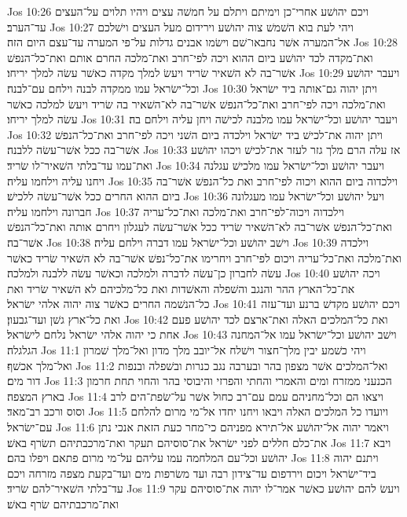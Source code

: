 Jos 10:26  ויכם יהושׁע אחרי־כן וימיתם ויתלם על חמשׁה עצים ויהיו תלוים על־העצים עד־הערב׃
Jos 10:27  ויהי לעת בוא השׁמשׁ צוה יהושׁע וירידום מעל העצים וישׁלכם אל־המערה אשׁר נחבאו־שׁם וישׂמו אבנים גדלות על־פי המערה עד־עצם היום הזה׃
Jos 10:28  ואת־מקדה לכד יהושׁע ביום ההוא ויכה לפי־חרב ואת־מלכה החרם אותם ואת־כל־הנפשׁ אשׁר־בה לא השׁאיר שׂריד ויעשׂ למלך מקדה כאשׁר עשׂה למלך יריחו׃
Jos 10:29  ויעבר יהושׁע וכל־ישׂראל עמו ממקדה לבנה וילחם עם־לבנה׃
Jos 10:30  ויתן יהוה גם־אותה ביד ישׂראל ואת־מלכה ויכה לפי־חרב ואת־כל־הנפשׁ אשׁר־בה לא־השׁאיר בה שׂריד ויעשׂ למלכה כאשׁר עשׂה למלך יריחו׃
Jos 10:31  ויעבר יהושׁע וכל־ישׂראל עמו מלבנה לכישׁה ויחן עליה וילחם בה׃
Jos 10:32  ויתן יהוה את־לכישׁ ביד ישׂראל וילכדה ביום השׁני ויכה לפי־חרב ואת־כל־הנפשׁ אשׁר־בה ככל אשׁר־עשׂה ללבנה׃
Jos 10:33  אז עלה הרם מלך גזר לעזר את־לכישׁ ויכהו יהושׁע ואת־עמו עד־בלתי השׁאיר־לו שׂריד׃
Jos 10:34  ויעבר יהושׁע וכל־ישׂראל עמו מלכישׁ עגלנה ויחנו עליה וילחמו עליה׃
Jos 10:35  וילכדוה ביום ההוא ויכוה לפי־חרב ואת כל־הנפשׁ אשׁר־בה ביום ההוא החרים ככל אשׁר־עשׂה ללכישׁ׃
Jos 10:36  ויעל יהושׁע וכל־ישׂראל עמו מעגלונה חברונה וילחמו עליה׃
Jos 10:37  וילכדוה ויכוה־לפי־חרב ואת־מלכה ואת־כל־עריה ואת־כל־הנפשׁ אשׁר־בה לא־השׁאיר שׂריד ככל אשׁר־עשׂה לעגלון ויחרם אותה ואת־כל־הנפשׁ אשׁר־בה׃
Jos 10:38  וישׁב יהושׁע וכל־ישׂראל עמו דברה וילחם עליה׃
Jos 10:39  וילכדה ואת־מלכה ואת־כל־עריה ויכום לפי־חרב ויחרימו את־כל־נפשׁ אשׁר־בה לא השׁאיר שׂריד כאשׁר עשׂה לחברון כן־עשׂה לדברה ולמלכה וכאשׁר עשׂה ללבנה ולמלכה׃
Jos 10:40  ויכה יהושׁע את־כל־הארץ ההר והנגב והשׁפלה והאשׁדות ואת כל־מלכיהם לא השׁאיר שׂריד ואת כל־הנשׁמה החרים כאשׁר צוה יהוה אלהי ישׂראל׃
Jos 10:41  ויכם יהושׁע מקדשׁ ברנע ועד־עזה ואת כל־ארץ גשׁן ועד־גבעון׃
Jos 10:42  ואת כל־המלכים האלה ואת־ארצם לכד יהושׁע פעם אחת כי יהוה אלהי ישׂראל נלחם לישׂראל׃
Jos 10:43  וישׁב יהושׁע וכל־ישׂראל עמו אל־המחנה הגלגלה׃
Jos 11:1  ויהי כשׁמע יבין מלך־חצור וישׁלח אל־יובב מלך מדון ואל־מלך שׁמרון ואל־מלך אכשׁף׃
Jos 11:2  ואל־המלכים אשׁר מצפון בהר ובערבה נגב כנרות ובשׁפלה ובנפות דור מים׃
Jos 11:3  הכנעני ממזרח ומים והאמרי והחתי והפרזי והיבוסי בהר והחוי תחת חרמון בארץ המצפה׃
Jos 11:4  ויצאו הם וכל־מחניהם עמם עם־רב כחול אשׁר על־שׂפת־הים לרב וסוס ורכב רב־מאד׃
Jos 11:5  ויועדו כל המלכים האלה ויבאו ויחנו יחדו אל־מי מרום להלחם עם־ישׂראל׃
Jos 11:6  ויאמר יהוה אל־יהושׁע אל־תירא מפניהם כי־מחר כעת הזאת אנכי נתן את־כלם חללים לפני ישׂראל את־סוסיהם תעקר ואת־מרכבתיהם תשׂרף באשׁ׃
Jos 11:7  ויבא יהושׁע וכל־עם המלחמה עמו עליהם על־מי מרום פתאם ויפלו בהם׃
Jos 11:8  ויתנם יהוה ביד־ישׂראל ויכום וירדפום עד־צידון רבה ועד משׂרפות מים ועד־בקעת מצפה מזרחה ויכם עד־בלתי השׁאיר־להם שׂריד׃
Jos 11:9  ויעשׂ להם יהושׁע כאשׁר אמר־לו יהוה את־סוסיהם עקר ואת־מרכבתיהם שׂרף באשׁ׃
